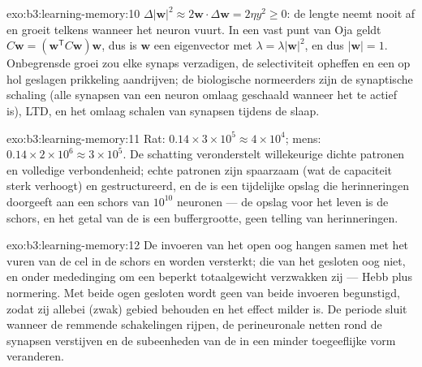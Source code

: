 \begin{solution}{exo:b3:learning-memory:10}
$\Delta|\mathbf{w}|^{2} \approx 2\mathbf{w}\cdot\Delta\mathbf{w} = 2\eta
y^{2} \ge 0$: de lengte neemt nooit af en groeit telkens wanneer het
neuron vuurt. In een vast punt van Oja geldt $C\mathbf{w} = (\mathbf{w}^{\mathsf{T}}C
\mathbf{w})\mathbf{w}$, dus is $\mathbf{w}$ een eigenvector met $\lambda =
\lambda|\mathbf{w}|^{2}$, en dus $|\mathbf{w}| = 1$. Onbegrensde groei
zou elke synaps verzadigen, de selectiviteit opheffen en een op hol
geslagen prikkeling aandrijven; de biologische normeerders zijn de
synaptische schaling (alle synapsen van een neuron omlaag geschaald
wanneer het te actief is), LTD, en het omlaag schalen van synapsen
tijdens de slaap.
\end{solution}

\begin{solution}{exo:b3:learning-memory:11}
Rat: $0.14\times 3\times 10^{5} \approx 4\times 10^{4}$; mens: $0.14
\times 2\times 10^{6} \approx 3\times 10^{5}$. De schatting
veronderstelt willekeurige dichte patronen en volledige verbondenheid;
echte patronen zijn spaarzaam (wat de capaciteit sterk verhoogt) en
gestructureerd, en de  is een tijdelijke opslag die
herinneringen doorgeeft aan een schors van $10^{10}$ neuronen --- de
opslag voor het leven is de schors, en het getal van de  is
een buffergrootte, geen telling van herinneringen.
\end{solution}

\begin{solution}{exo:b3:learning-memory:12}
De invoeren van het open oog hangen samen met het vuren van de cel in
de schors en worden versterkt; die van het gesloten oog niet, en onder
mededinging om een beperkt totaalgewicht verzwakken zij --- Hebb plus
normering. Met beide ogen gesloten wordt geen van beide invoeren
begunstigd, zodat zij allebei (zwak) gebied behouden en het effect
milder is. De periode sluit wanneer de remmende schakelingen rijpen, de
perineuronale netten rond de synapsen verstijven en de subeenheden van
de  in een minder toegeeflijke vorm veranderen.
\end{solution}

